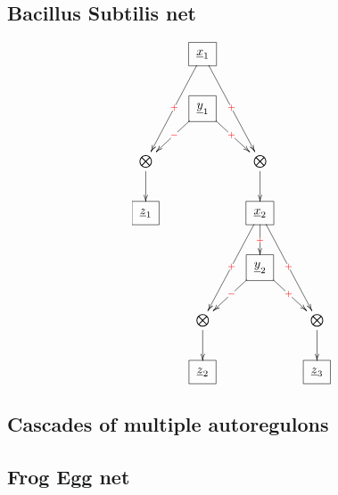 \subsection{Bacillus Subtilis net}

\begin{figure}[h!]
$$
\xymatrix{
&\Rect{\rvx_1}\ar[ddl]|\redplus
\ar[ddr]|\redplus
\\
&\Rect{\rvy_1}
\ar[dl]|\redminus
\ar[dr]|\redplus
\\
\bigotimes\ar[d]
&&\bigotimes\ar[d]
\\
\Rect{\rvz_1}
&&\Rect{\rvx_2}
\ar[d]|\redplus
\ar[ddl]|\redplus
\ar[ddr]|\redplus
\\
&&\Rect{\rvy_2}\ar[dl]|\redminus
\ar[dr]|\redplus
\\
&\bigotimes\ar[d]
&&\bigotimes\ar[d]
\\
&\Rect{\rvz_2}
&&\Rect{\rvz_3}
}$$
\end{figure}




\subsection{Cascades of multiple autoregulons}


\xymatrix@C =5pc{
\Rect{\rvx}\ar[r]|\redplus
&\Rect{\rvy}\ar[r]|\redplus
&\Rect{\rvz}
}

\xymatrix@C=5pc{
\Rect{\rvx}\ar[r]|\redminus
&\Rect{\rvy}\ar[r]|\redminus
&\Rect{\rvz}
}



\subsection{Frog Egg net}
